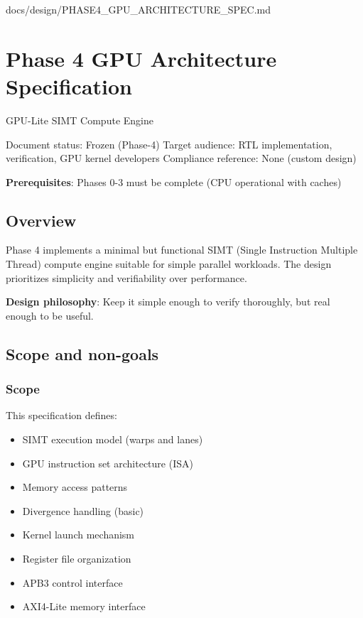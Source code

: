 \begin{relocated}{docs/design/PHASE4_GPU_ARCHITECTURE_SPEC.md}
\section{Phase 4 GPU Architecture Specification}\label{ds:ch:phase4-gpu-architecture}

GPU-Lite SIMT Compute Engine

Document status: Frozen (Phase-4) Target audience: RTL implementation,
verification, GPU kernel developers Compliance reference: None (custom
design)

\textbf{Prerequisites}: Phases 0-3 must be complete (CPU operational
with caches)

\subsection{Overview}\label{ds:ch:phase4-gpu-architecture:overview}

Phase 4 implements a minimal but functional SIMT (Single Instruction
Multiple Thread) compute engine suitable for simple parallel workloads.
The design prioritizes simplicity and verifiability over performance.

\textbf{Design philosophy}: Keep it simple enough to verify thoroughly,
but real enough to be useful.

\subsection{Scope and non-goals}\label{ds:ch:phase4-gpu-architecture:scope-and-non-goals}

\subsubsection{Scope}\label{ds:ch:phase4-gpu-architecture:scope}

This specification defines:

\begin{itemize}
\tightlist
\item
  SIMT execution model (warps and lanes)
\item
  GPU instruction set architecture (ISA)
\item
  Memory access patterns
\item
  Divergence handling (basic)
\item
  Kernel launch mechanism
\item
  Register file organization
\item
  APB3 control interface
\item
  AXI4-Lite memory interface
\end{itemize}


\end{relocated}
